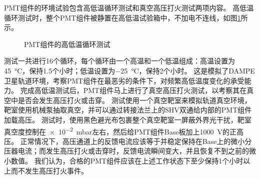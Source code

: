 PMT组件的环境试验包含高低温循环测试和真空高压打火测试两项内容。
高低温循环测试时，整个PMT组件被静置在高低温试验箱中，不加电不连线，如图\ref{fig:construction:cycling}所示。
\begin{figure}[htb]
\centering
{}
{}
\caption{PMT组件的高低温循环测试}
\label{fig:construction:cycling}
\end{figure}
测试一共进行16个循环，每个循环由一个高温和一个低温组成：高温设置为\SI{45}{\celsius}，保持1.5个小时；低温设置为\SI{-25}{\celsius}，保持2个小时。
这是模拟了DAMPE卫星轨道环境，考察PMT组件在最恶劣的条件下，对频繁高低温度变化的承受能力。
完成高低温测试后，PMT组件马上进行了真空高压打火测试，以考察其在真空中是否会发生高压打火或击穿。
测试使用一个真空靶室来模拟轨道真空环境，靶室使用机械泵抽取真空，并可以通过转接法兰上的SHV双通给内部的PMT组件加载高压。
测试时，使用黑色避光布包裹整个真空靶室一屏蔽外界光干扰，靶室真空度控制在\SI{e-2}{mbar}左右，然后给PMT组件Base板加上\SI{1000}{V}的正高压。
正常情况下，高压通道上的反馈电流应该等于并稳定保持在Base上的微小分压器电流；而发生高压打火或击穿时，反馈电流瞬间变大，并且恢复不到之前的微小数值。
我们认为，合格的PMT组件应该在上述工作状态下至少保持1个小时以上而不发生高压打火事件。

